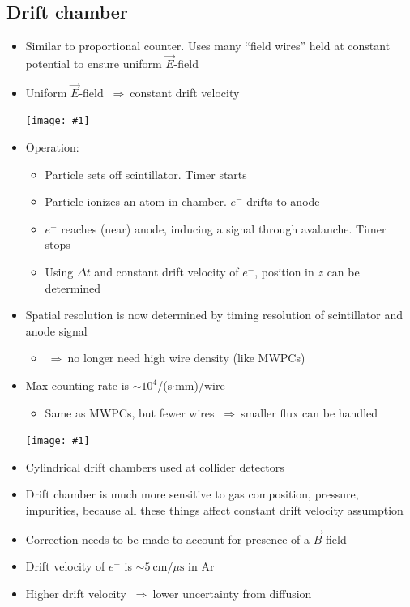 \documentclass[11pt]{article}
\newcommand{\E}{\ensuremath{\vec{E}}}
\newcommand{\B}{\ensuremath{\vec{B}}}
\newcommand{\mus}{\mu\text{s}}
\newcommand{\cm}{\text{cm}}
\newcommand{\el}{\ensuremath{e^{-}}\xspace}
\newcommand{\thus}{$~\Rightarrow~$}
\newcommand{\embedimgw}[2]{\begin{center}\texttt{[image: \#1]}\end{center}}
\begin{document}
\subsection{Drift chamber}
\begin{itemize}
  \item Similar to proportional counter. Uses many ``field wires'' held at constant potential to ensure uniform $\E$-field
  \item Uniform $\E$-field \thus constant drift velocity
  \embedimgw{figs/drift1.png}{.8}
  \item Operation:
  \begin{itemize}
    \item Particle sets off scintillator. Timer starts
    \item Particle ionizes an atom in chamber. \el drifts to anode
    \item \el reaches (near) anode, inducing a signal through avalanche. Timer stops
    \item Using $\Delta t$ and constant drift velocity of $\el$, position in $z$ can be determined
  \end{itemize}
  \item Spatial resolution is now determined by timing resolution of scintillator and anode signal
  \begin{itemize}
    \item \thus no longer need high wire density (like MWPCs)
  \end{itemize}
  \item Max counting rate is $\sim 10^4$/(s$\cdot$mm)/wire
  \begin{itemize}
    \item Same as MWPCs, but fewer wires \thus smaller flux can be handled
  \end{itemize}
  \embedimgw{figs/drift2.png}{.8}
  \item Cylindrical drift chambers used at collider detectors
  \item Drift chamber is much more sensitive to gas composition, pressure, impurities, because all these things affect constant drift velocity assumption
  \item Correction needs to be made to account for presence of a $\B$-field
  \item Drift velocity of $\el$ is $\sim 5~\cm/\mus$ in Ar
  \item Higher drift velocity \thus lower uncertainty from diffusion
\end{itemize}
\end{document}
